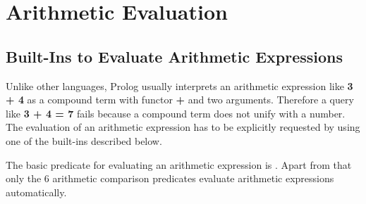 %
% 
% 
% 
% 
%
%
%
%
%
\chapter{Arithmetic Evaluation}
\label{chaparith}

\section{Built-Ins to Evaluate Arithmetic Expressions}
Unlike other languages, Prolog usually interprets an arithmetic expression like
{\bf 3 + 4} as a compound term with functor {\bf +} and two arguments.
Therefore a query like {\bf 3 + 4 = 7} fails because a compound term does not
unify with a number. The evaluation of an arithmetic expression has to be
explicitly requested by using one of the built-ins described below.

The basic predicate for evaluating an arithmetic expression is .
Apart from that only the 6 arithmetic comparison predicates evaluate
arithmetic expressions automatically.

